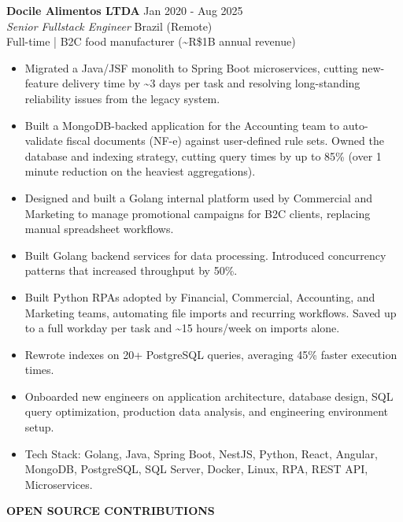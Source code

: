 \documentclass[10pt,a4paper]{article}
\newcommand{\cvsection}[1]{%
    \vspace{8pt}%
    {\large\bfseries\uppercase{#1}}\\[2pt]%
    \vspace{2pt}%
}
\newcommand{\rolehead}[4]{%
    \needspace{4\baselineskip}%
    \textbf{#1} \hfill #2\\
    \textit{#3} \hfill #4\\
}
\begin{document}
\rolehead{Docile Alimentos LTDA}{Jan 2020 - Aug 2025}{Senior Fullstack Engineer}{Brazil (Remote)}
{\footnotesize Full-time | B2C food manufacturer (\textasciitilde R\$1B annual revenue)}
\nopagebreak
\begin{itemize}
    \item {\footnotesize Migrated a Java/JSF monolith to Spring Boot microservices, cutting new-feature delivery time by \textasciitilde3 days per task and resolving long-standing reliability issues from the legacy system.}
    \item {\footnotesize Built a MongoDB-backed application for the Accounting team to auto-validate fiscal documents (NF-e) against user-defined rule sets. Owned the database and indexing strategy, cutting query times by up to 85\% (over 1 minute reduction on the heaviest aggregations).}
    \item {\footnotesize Designed and built a Golang internal platform used by Commercial and Marketing to manage promotional campaigns for B2C clients, replacing manual spreadsheet workflows.}
    \item {\footnotesize Built Golang backend services for data processing. Introduced concurrency patterns that increased throughput by 50\%.}
    \item {\footnotesize Built Python RPAs adopted by Financial, Commercial, Accounting, and Marketing teams, automating file imports and recurring workflows. Saved up to a full workday per task and \textasciitilde15 hours/week on imports alone.}
    \item {\footnotesize Rewrote indexes on 20+ PostgreSQL queries, averaging 45\% faster execution times.}
    \item {\footnotesize Onboarded new engineers on application architecture, database design, SQL query optimization, production data analysis, and engineering environment setup.}
    \item {\footnotesize Tech Stack: Golang, Java, Spring Boot, NestJS, Python, React, Angular, MongoDB, PostgreSQL, SQL Server, Docker, Linux, RPA, REST API, Microservices.}
\end{itemize}

\cvsection{Open Source Contributions}
\end{document}

